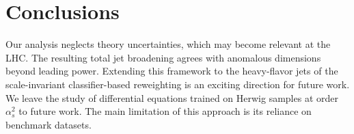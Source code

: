 \section{Conclusions}\label{sec:conclusions}

Our analysis neglects theory uncertainties, which may become relevant at
the LHC. The resulting total jet broadening agrees with anomalous
dimensions beyond leading power. Extending this framework to the
heavy-flavor jets of the scale-invariant classifier-based reweighting is
an exciting direction for future work. We leave the study of
differential equations trained on Herwig samples at order $\alpha_s^2$
to future work. The main limitation of this approach is its reliance on
benchmark datasets.

